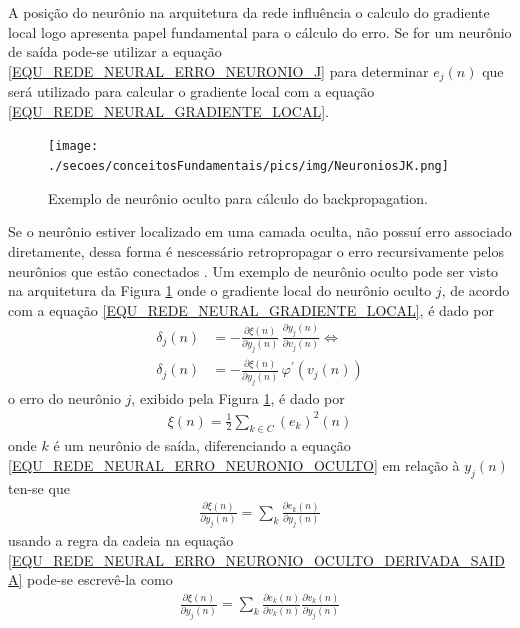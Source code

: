 A posição do neurônio na arquitetura da rede influência o calculo do gradiente local logo apresenta papel fundamental para o cálculo do erro. Se for um neurônio de saída pode-se utilizar a equação \eqref{EQU_REDE_NEURAL_ERRO_NEURONIO_J} para determinar \(e_{j}(n)\) que será utilizado para calcular o gradiente local com a equação \eqref{EQU_REDE_NEURAL_GRADIENTE_LOCAL}.
\begin{figure}[H]
	\centering
 	  \caption{Exemplo de neurônio oculto para cálculo do backpropagation.}
		\texttt{[image: ./secoes/conceitosFundamentais/pics/img/NeuroniosJK.png]}
	\label{FIGURA_REDE_NEURAL_NEURONIOS_BACKPROPAGATION}
\end{figure}
Se o neurônio estiver localizado em uma camada oculta, não possuí erro associado diretamente, dessa forma é nescessário retropropagar o erro recursivamente pelos neurônios que estão conectados \cite{Haykin2007}. Um exemplo de neurônio oculto pode ser visto na arquitetura da Figura \ref{FIGURA_REDE_NEURAL_NEURONIOS_BACKPROPAGATION} onde o gradiente local do neurônio oculto \(j\), de acordo com a equação \eqref{EQU_REDE_NEURAL_GRADIENTE_LOCAL}, é dado por
\begin{align}
\delta_{j}(n) &= - \frac{\partial \xi(n)}{\partial y_{j}(n)} \, \frac{\partial y_{j}(n)}{\partial v_{j}(n)} \Leftrightarrow \label{EQU_REDE_NEURAL_GRADIENTE_LOCAL_CASO2}\\
\delta_{j}(n) &= - \frac{\partial \xi(n)}{\partial y_{j}(n)} \, \varphi^{'}(v_{j}(n))
\end{align}
o erro do neurônio \(j\), exibido pela Figura \ref{FIGURA_REDE_NEURAL_NEURONIOS_BACKPROPAGATION}, é dado por
\begin{align}
\xi(n) = \frac{1}{2} \sum\limits_{k \in C}(e_{k})^{2}(n) \label{EQU_REDE_NEURAL_ERRO_NEURONIO_OCULTO}
\end{align}
onde \(k\) é um neurônio de saída, diferenciando a equação \eqref{EQU_REDE_NEURAL_ERRO_NEURONIO_OCULTO} em relação à \(y_{j}(n)\) ten-se que
\begin{align}
\frac{\partial \xi(n)}{\partial y_{j}(n)} = \sum\limits_{k} \frac{\partial e_{k}(n)}{\partial y_{j}(n)}  \label{EQU_REDE_NEURAL_ERRO_NEURONIO_OCULTO_DERIVADA_SAIDA}
\end{align}
usando a regra da cadeia na equação \eqref{EQU_REDE_NEURAL_ERRO_NEURONIO_OCULTO_DERIVADA_SAIDA} pode-se escrevê-la como
\begin{align}
\frac{\partial \xi(n)}{\partial y_{j}(n)} = \sum\limits_{k} \frac{\partial e_{k}(n)}{\partial v_{k}(n)} \frac{\partial v_{k}(n)}{\partial y_{j}(n)} \label{EQU_REDE_NEURAL_ERRO_NEURONIO_OCULTO_DERIVADA_SAIDA_REGRA_CADEIA}
\end{align}

